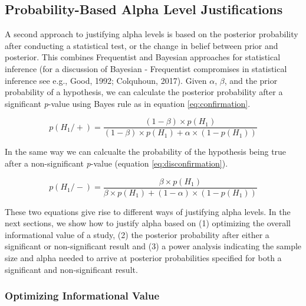 \documentclass[
  english,
  ,jou,floatsintext]{apa6}
\begin{document}
\hypertarget{probability-based-alpha-level-justifications}{%
\subsection{Probability-Based Alpha Level Justifications}\label{probability-based-alpha-level-justifications}}

A second approach to justifying alpha levels is based on the posterior probability after conducting a statistical test, or the change in belief between prior and posterior. This combines Frequentist and Bayesian approaches for statistical inference (for a discussion of Bayesian - Frequentist compromises in statistical inference see e.g., Good, 1992; Colquhoun, 2017). Given \(\alpha\), \(\beta\), and the prior probability of a hypothesis, we can calculate the posterior probability after a significant \emph{p}-value using Bayes rule as in equation \ref{eq:confirmation}.

\begin{equation}
p(H_1/+) = \frac{(1-\beta) \times p(H_1)}{(1-\beta) \times p(H_1)+ \alpha \times (1-p(H_1))}
\label{eq:confirmation}
\end{equation}

In the same way we can calcualte the probability of the hypothesis being true after a non-significant \emph{p}-value (equation \ref{eq:disconfirmation}).

\begin{equation}
p(H_1/-) = \frac{\beta \times p(H_1)}{\beta \times p(H_1)+(1-\alpha) \times (1-p(H_1))}
\label{eq:disconfirmation}
\end{equation}

These two equations give rise to different ways of justifying alpha levels. In the next sections, we show how to justify alpha based on (1) optimizing the overall informational value of a study, (2) the posterior probability after either a significant or non-significant result and (3) a power analysis indicating the sample size and alpha needed to arrive at posterior probabilities specified for both a significant and non-significant result.

\hypertarget{optimizing-informational-value}{%
\subsubsection{Optimizing Informational Value}\label{optimizing-informational-value}}
\end{document}

